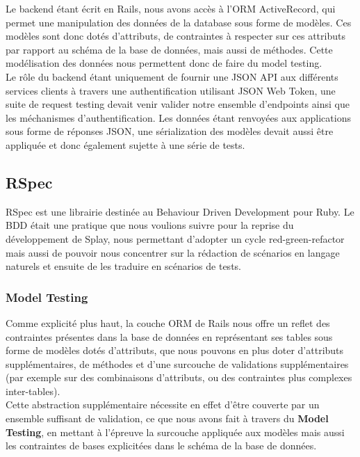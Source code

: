 \documentclass{eplmastersthesis}
\begin{document}
      Le backend étant écrit en Rails, nous avons accès à l'ORM ActiveRecord, qui
      permet une manipulation des données de la database sous forme de modèles.
      Ces modèles sont donc dotés d'attributs, de contraintes à respecter sur
      ces attributs par rapport au schéma de la base de données, mais aussi de
      méthodes. Cette modélisation des données nous permettent donc de faire
      du model testing.\\

      Le rôle du backend étant uniquement de fournir une JSON API
      aux différents services clients à travers une authentification utilisant
      JSON Web Token, une suite de request testing devait venir valider
      notre ensemble d'endpoints ainsi que les méchanismes d'authentification.
      Les données étant renvoyées aux applications sous forme de réponses
      JSON, une sérialization des modèles devait aussi être appliquée et donc
      également sujette à une série de tests.

      \subsection{RSpec}

        RSpec est une librairie destinée au Behaviour Driven Development
        pour Ruby. Le BDD était une pratique que nous voulions suivre pour
        la reprise du développement de Splay, nous permettant d'adopter
        un cycle red-green-refactor mais aussi de pouvoir nous concentrer sur
        la rédaction de scénarios en langage naturels et ensuite de les
        traduire en scénarios de tests.

        \subsubsection{Model Testing}

          Comme explicité plus haut, la couche ORM de Rails nous offre un
          reflet des contraintes présentes dans la base de données en représentant
          ses tables sous forme de modèles dotés d'attributs, que nous pouvons en
          plus doter d'attributs supplémentaires, de méthodes et d'une surcouche
          de validations supplémentaires (par exemple sur des combinaisons d'attributs,
          ou des contraintes plus complexes inter-tables).\\

          Cette abstraction supplémentaire nécessite en effet d'être couverte par
          un ensemble suffisant de validation, ce que nous avons fait à travers
          du \textbf{Model Testing}, en mettant à l'épreuve la surcouche appliquée
          aux modèles mais aussi les contraintes de bases explicitées dans le
          schéma de la base de données.\\
\end{document}

